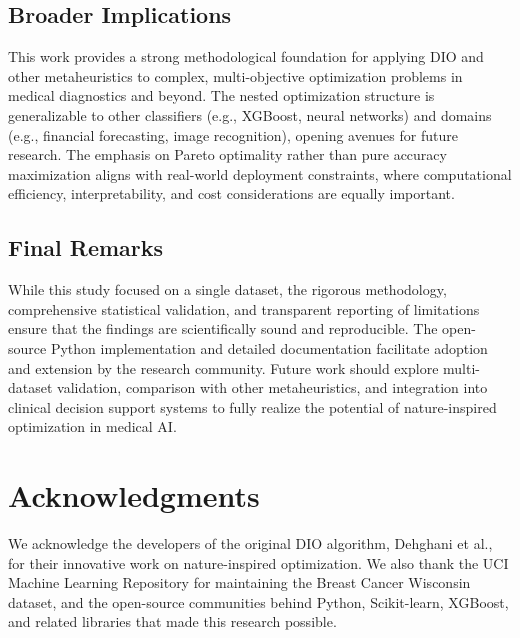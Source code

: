 \documentclass[12pt, a4paper]{article}
\begin{document}
\subsection{Broader Implications}
This work provides a strong methodological foundation for applying DIO and other metaheuristics to complex, multi-objective optimization problems in medical diagnostics and beyond. The nested optimization structure is generalizable to other classifiers (e.g., XGBoost, neural networks) and domains (e.g., financial forecasting, image recognition), opening avenues for future research. The emphasis on Pareto optimality rather than pure accuracy maximization aligns with real-world deployment constraints, where computational efficiency, interpretability, and cost considerations are equally important.

\subsection{Final Remarks}
While this study focused on a single dataset, the rigorous methodology, comprehensive statistical validation, and transparent reporting of limitations ensure that the findings are scientifically sound and reproducible. The open-source Python implementation and detailed documentation facilitate adoption and extension by the research community. Future work should explore multi-dataset validation, comparison with other metaheuristics, and integration into clinical decision support systems to fully realize the potential of nature-inspired optimization in medical AI.

\section*{Acknowledgments}
We acknowledge the developers of the original DIO algorithm, Dehghani et al., for their innovative work on nature-inspired optimization. We also thank the UCI Machine Learning Repository for maintaining the Breast Cancer Wisconsin dataset, and the open-source communities behind Python, Scikit-learn, XGBoost, and related libraries that made this research possible.

\end{document}
